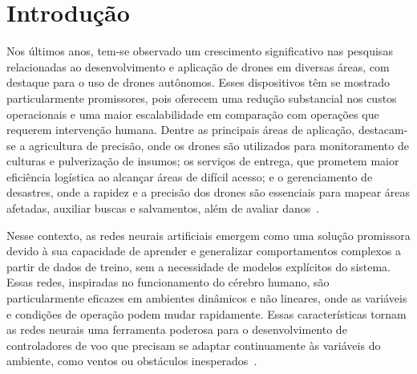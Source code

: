\documentclass[12pt]{article}
\begin{document}
\newpage
{}
\begin{abstract}
The rapid technological advancements have driven the adoption of autonomous drones across various fields, notably in precision agriculture, logistics, and disaster management, where these devices provide increased efficiency and scalability compared to human-operated systems. In this context, artificial neural networks emerge as a promising solution due to their ability to adapt to dynamic and nonlinear environments. Simultaneously, genetic algorithms (GAs) have proven effective in optimizing neural networks by efficiently exploring solution spaces to adjust weights and parameters.

This study proposes the development of a neural controller for quadcopter drones using GAs, focusing on autonomous navigation in simulated environments. The controller is trained to navigate the drone to designated locations, assuming continuous flight without addressing takeoff or landing. To achieve this, a virtual environment was modeled using the Gymnasium platform, a neural network was implemented for drone control, and genetic algorithms were applied to optimize the controller.
\end{abstract}
\newpage

\section{Introdução}
Nos últimos anos, tem-se observado um crescimento significativo nas pesquisas relacionadas ao desenvolvimento e aplicação de drones em diversas áreas, com destaque para o uso de drones autônomos. Esses dispositivos têm se mostrado particularmente promissores, pois oferecem uma redução substancial nos custos operacionais e uma maior escalabilidade em comparação com operações que requerem intervenção humana. Dentre as principais áreas de aplicação, destacam-se a agricultura de precisão, onde os drones são utilizados para monitoramento de culturas e pulverização de insumos; os serviços de entrega, que prometem maior eficiência logística ao alcançar áreas de difícil acesso; e o gerenciamento de desastres, onde a rapidez e a precisão dos drones são essenciais para mapear áreas afetadas, auxiliar buscas e salvamentos, além de avaliar danos~\cite{Agriculture, DeliverySystem, DisasterManagement}.

Nesse contexto, as redes neurais artificiais emergem como uma solução promissora devido à sua capacidade de aprender e generalizar comportamentos complexos a partir de dados de treino, sem a necessidade de modelos explícitos do sistema. Essas redes, inspiradas no funcionamento do cérebro humano, são particularmente eficazes em ambientes dinâmicos e não lineares, onde as variáveis e condições de operação podem mudar rapidamente. Essas características tornam as redes neurais uma ferramenta poderosa para o desenvolvimento de controladores de voo que precisam se adaptar continuamente às variáveis do ambiente, como ventos ou obstáculos inesperados~\cite{AutonomousDroneRL}.
\end{document}
